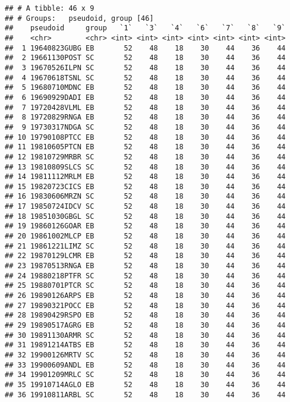 \documentclass[
]{article}
\begin{document}
\begin{verbatim}
## # A tibble: 46 x 9
## # Groups:   pseudoid, group [46]
##    pseudoid     group   `1`   `3`   `4`   `6`   `7`   `8`   `9`
##    <chr>        <chr> <int> <int> <int> <int> <int> <int> <int>
##  1 19640823GUBG EB       52    48    18    30    44    36    44
##  2 19661130POST SC       52    48    18    30    44    36    44
##  3 19670526ILPN SC       52    48    18    30    44    36    44
##  4 19670618TSNL SC       52    48    18    30    44    36    44
##  5 19680710MDNC EB       52    48    18    30    44    36    44
##  6 19690929DADI EB       52    48    18    30    44    36    44
##  7 19720428VLML EB       52    48    18    30    44    36    44
##  8 19720829RNGA EB       52    48    18    30    44    36    44
##  9 19730317NDGA SC       52    48    18    30    44    36    44
## 10 19790108PTCC EB       52    48    18    30    44    36    44
## 11 19810605PTCN EB       52    48    18    30    44    36    44
## 12 19810729MRBR SC       52    48    18    30    44    36    44
## 13 19810809SLCS SC       52    48    18    30    44    36    44
## 14 19811112MRLM EB       52    48    18    30    44    36    44
## 15 19820723CICS EB       52    48    18    30    44    36    44
## 16 19830606MRZN SC       52    48    18    30    44    36    44
## 17 19850724IDCV SC       52    48    18    30    44    36    44
## 18 19851030GBGL SC       52    48    18    30    44    36    44
## 19 19860126GOAR EB       52    48    18    30    44    36    44
## 20 19861002MLCP EB       52    48    18    30    44    36    44
## 21 19861221LIMZ SC       52    48    18    30    44    36    44
## 22 19870129LCMR EB       52    48    18    30    44    36    44
## 23 19870513RNGA EB       52    48    18    30    44    36    44
## 24 19880218PTFR SC       52    48    18    30    44    36    44
## 25 19880701PTCR SC       52    48    18    30    44    36    44
## 26 19890126ARPS EB       52    48    18    30    44    36    44
## 27 19890321POCC EB       52    48    18    30    44    36    44
## 28 19890429RSPO EB       52    48    18    30    44    36    44
## 29 19890517AGRG EB       52    48    18    30    44    36    44
## 30 19891130ARMR SC       52    48    18    30    44    36    44
## 31 19891214ATBS EB       52    48    18    30    44    36    44
## 32 19900126MRTV SC       52    48    18    30    44    36    44
## 33 19900609ANDL EB       52    48    18    30    44    36    44
## 34 19901209MRLC SC       52    48    18    30    44    36    44
## 35 19910714AGLO EB       52    48    18    30    44    36    44
## 36 19910811ARBL SC       52    48    18    30    44    36    44

\end{verbatim}
\end{document}

